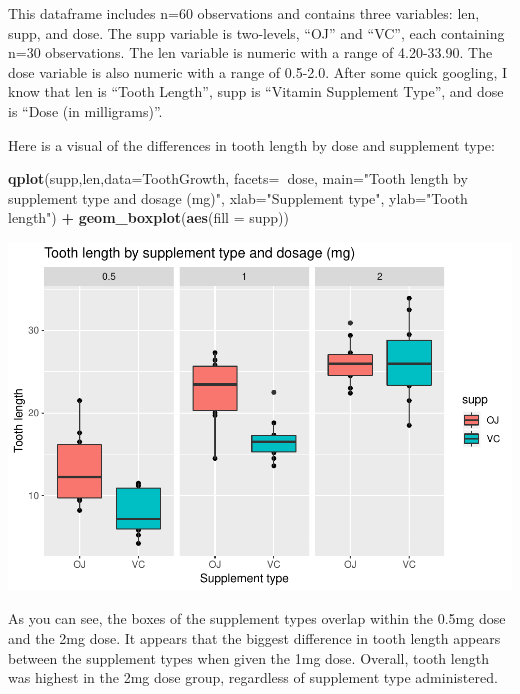 \documentclass[]{article}
\newenvironment{Shaded}{\begin{snugshade}}{\end{snugshade}}
\newcommand{\KeywordTok}[1]{\textcolor[rgb]{0.13,0.29,0.53}{\textbf{#1}}}
\newcommand{\DataTypeTok}[1]{\textcolor[rgb]{0.13,0.29,0.53}{#1}}
\newcommand{\StringTok}[1]{\textcolor[rgb]{0.31,0.60,0.02}{#1}}
\newcommand{\OperatorTok}[1]{\textcolor[rgb]{0.81,0.36,0.00}{\textbf{#1}}}
\newcommand{\NormalTok}[1]{#1}
\begin{document}
This dataframe includes n=60 observations and contains three variables:
len, supp, and dose. The supp variable is two-levels, ``OJ'' and ``VC'',
each containing n=30 observations. The len variable is numeric with a
range of 4.20-33.90. The dose variable is also numeric with a range of
0.5-2.0. After some quick googling, I know that len is ``Tooth Length'',
supp is ``Vitamin Supplement Type'', and dose is ``Dose (in
milligrams)''.

Here is a visual of the differences in tooth length by dose and
supplement type:

\begin{Shaded}
\begin{Highlighting}[]
        \KeywordTok{qplot}\NormalTok{(supp,len,}\DataTypeTok{data=}\NormalTok{ToothGrowth, }\DataTypeTok{facets=}\OperatorTok{~}\NormalTok{dose, }
              \DataTypeTok{main=}\StringTok{"Tooth length by supplement type and dosage (mg)"}\NormalTok{, }
              \DataTypeTok{xlab=}\StringTok{"Supplement type"}\NormalTok{, }\DataTypeTok{ylab=}\StringTok{"Tooth length"}\NormalTok{) }\OperatorTok{+}\StringTok{ }
\StringTok{        }\KeywordTok{geom_boxplot}\NormalTok{(}\KeywordTok{aes}\NormalTok{(}\DataTypeTok{fill =}\NormalTok{ supp))}
\end{Highlighting}
\end{Shaded}

\includegraphics{figures/fig-qplot-1.pdf}

As you can see, the boxes of the supplement types overlap within the
0.5mg dose and the 2mg dose. It appears that the biggest difference in
tooth length appears between the supplement types when given the 1mg
dose. Overall, tooth length was highest in the 2mg dose group,
regardless of supplement type administered.
\end{document}
